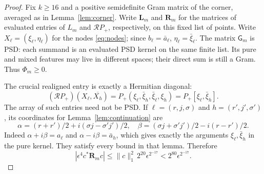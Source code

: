 \begin{proof}
Fix \(k\ge16\) and a
positive semidefinite Gram matrix of the corner, averaged as in
Lemma~\ref{lem:corner}. Write $\mathbf L_m$ and $\mathbf R_m$ for the matrices of
evaluated entries of $L_m$ and $\mathcal RP_+$, respectively, on this
fixed list of points. Write \(X_\ell=(\xi_\ell,\eta_\ell)\) for the nodes
\eqref{eq:nodes}; since \(b_\ell=\bar a_\ell\), \(\eta_\ell=\bar \xi_\ell\). The matrix \(\mathsf G_m\)
is PSD: each summand is an evaluated PSD kernel on the same finite list.
Its pure and mixed features may live in different spaces; their direct
sum is still a Gram. Thus \(\Phi_m\ge0\).

The crucial realigned entry is exactly a Hermitian diagonal:
\begin{equation}
 (\mathcal RP_+)(X_\ell,\overline{X_h})
 =P_+(\xi_\ell,\bar \xi_h,\bar \xi_\ell,\xi_h)
 =P_+[\xi_\ell,\bar \xi_h].                               \label{eq:realigned-diagonal}
\end{equation}
The array of such entries need not be PSD. If
\(\ell=(r,j,\sigma)\) and \(h=(r',j',\sigma')\), its coordinates for Lemma~\ref{lem:continuation} are
\[
 \alpha=(r+r')/2+i(\sigma j-\sigma'j')/2,\quad
 \beta=(\sigma j+\sigma'j')/2-i(r-r')/2.
\]
Indeed $\alpha+i\beta=a_\ell$ and $\alpha-i\beta=\bar a_h$,
which gives exactly the arguments $\xi_\ell,\bar\xi_h$ in the pure
kernel. They satisfy every bound in that lemma. Therefore
\begin{equation}
 \left|\epsilon^4 c^*\mathbf R_m c\right|
 \le\|c\|_1^2\,2^{20}\epsilon^{2^{-17}}
                    <2^{80}\epsilon^{2^{-17}}.         \label{eq:realigned-pairing}
\end{equation}


\end{proof}
